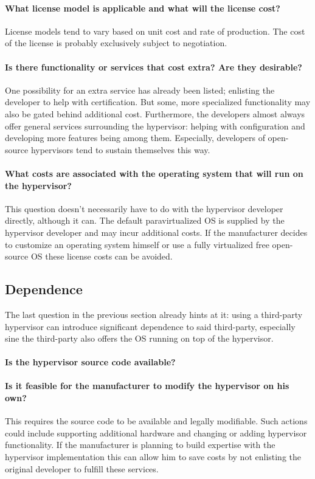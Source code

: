 \paragraph{What license model is applicable and what will the license cost?}
License models tend to vary based on unit cost and rate of production.
The cost of the license is probably exclusively subject to negotiation. 
\paragraph{Is there functionality or services that cost extra? Are they desirable?}
One possibility for an extra service has already been listed; enlisting the developer to help with certification. But some, more specialized functionality may also be gated behind additional cost. Furthermore, the developers almost always offer general services surrounding the hypervisor: helping with configuration and developing more features being among them. Especially, developers of open-source hypervisors tend to sustain themselves this way.
\paragraph{What costs are associated with the operating system that will run on the hypervisor?}
This question doesn't necessarily have to do with the hypervisor developer directly, although it can. The default paravirtualized \gls{OS} is supplied by the hypervisor developer and may incur additional costs. If the manufacturer decides to customize an operating system himself or use a fully virtualized free open-source \gls{OS} these license costs can be avoided. 
\subsection{Dependence}
The last question in the previous section already hints at it: using a third-party hypervisor can introduce significant dependence to said third-party, especially sine the third-party also offers the \gls{OS} running on top of the hypervisor.
\paragraph{Is the hypervisor source code available?}
\paragraph{Is it feasible for the manufacturer to modify the hypervisor on his own?}
This requires the source code to be available and legally modifiable. Such actions could include supporting additional hardware and changing or adding hypervisor functionality. If the manufacturer is planning to build expertise with the hypervisor implementation this can allow him to save costs by not enlisting the original developer to fulfill these services.

